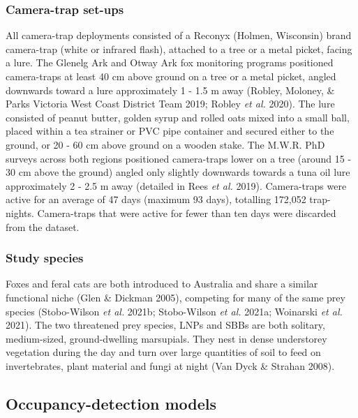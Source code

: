 \documentclass[11pt,a4paper,titlepage,twoside,openright]{style/unimelbthesis}
\begin{document}
\begin{mainmatter}
\hypertarget{camera-trap-set-ups}{%
\subsubsection{Camera-trap set-ups}\label{camera-trap-set-ups}}

All camera-trap deployments consisted of a Reconyx (Holmen, Wisconsin) brand camera-trap (white or infrared flash), attached to a tree or a metal picket, facing a lure. The Glenelg Ark and Otway Ark fox monitoring programs positioned camera-traps at least 40 cm above ground on a tree or a metal picket, angled downwards toward a lure approximately 1 - 1.5 m away (Robley, Moloney, \& Parks Victoria West Coast District Team 2019; Robley \emph{et al.} 2020). The lure consisted of peanut butter, golden syrup and rolled oats mixed into a small ball, placed within a tea strainer or PVC pipe container and secured either to the ground, or 20 - 60 cm above ground on a wooden stake. The M.W.R. PhD surveys across both regions positioned camera-traps lower on a tree (around 15 - 30 cm above the ground) angled only slightly downwards towards a tuna oil lure approximately 2 - 2.5 m away (detailed in Rees \emph{et al.} 2019). Camera-traps were active for an average of 47 days (maximum 93 days), totalling 172,052 trap-nights. Camera-traps that were active for fewer than ten days were discarded from the dataset.

\hypertarget{study-species-1}{%
\subsubsection{Study species}\label{study-species-1}}

Foxes and feral cats are both introduced to Australia and share a similar functional niche (Glen \& Dickman 2005), competing for many of the same prey species (Stobo-Wilson \emph{et al.} 2021b; Stobo-Wilson \emph{et al.} 2021a; Woinarski \emph{et al.} 2021). The two threatened prey species, LNPs and SBBs are both solitary, medium-sized, ground-dwelling marsupials. They nest in dense understorey vegetation during the day and turn over large quantities of soil to feed on invertebrates, plant material and fungi at night (Van Dyck \& Strahan 2008).

\hypertarget{occupancy-detection-models}{%
\subsection{Occupancy-detection models}\label{occupancy-detection-models}}


\end{mainmatter}
\end{document}
